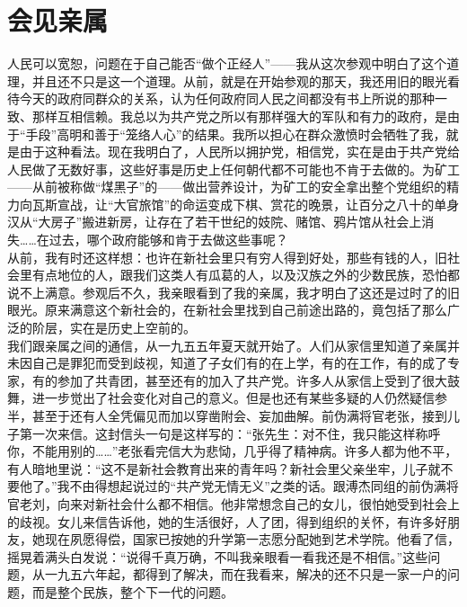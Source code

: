 \fancyhead[RO]{} %
\fancyhead[LE]{} %
\chapter*{会见亲属}
\thispagestyle{empty}
人民可以宽恕，问题在于自己能否“做个正经人”——我从这次参观中明白了这个道理，并且还不只是这一个道理。从前，就是在开始参观的那天，我还用旧的眼光看待今天的政府同群众的关系，认为任何政府同人民之间都没有书上所说的那种一致、那样互相信赖。我总以为共产党之所以有那样强大的军队和有力的政府，是由于“手段”高明和善于“笼络人心”的结果。我所以担心在群众激愤时会牺牲了我，就是由于这种看法。现在我明白了，人民所以拥护党，相信党，实在是由于共产党给人民做了无数好事，这些好事是历史上任何朝代都不可能也不肯于去做的。为矿工——从前被称做“煤黑子”的——做出营养设计，为矿工的安全拿出整个党组织的精力向瓦斯宣战，让“大官旅馆”的命运变成下棋、赏花的晚景，让百分之八十的单身汉从“大房子”搬进新房，让存在了若干世纪的妓院、赌馆、鸦片馆从社会上消失……在过去，哪个政府能够和肯于去做这些事呢？　\\

从前，我有时还这样想：也许在新社会里只有穷人得到好处，那些有钱的人，旧社会里有点地位的人，跟我们这类人有瓜葛的人，以及汉族之外的少数民族，恐怕都说不上满意。参观后不久，我亲眼看到了我的亲属，我才明白了这还是过时了的旧眼光。原来满意这个新社会的，在新社会里找到自己前途出路的，竟包括了那么广泛的阶层，实在是历史上空前的。\\

我们跟亲属之间的通信，从一九五五年夏天就开始了。人们从家信里知道了亲属并未因自己是罪犯而受到歧视，知道了子女们有的在上学，有的在工作，有的成了专家，有的参加了共青团，甚至还有的加入了共产党。许多人从家信上受到了很大鼓舞，进一步觉出了社会变化对自己的意义。但是也还有某些多疑的人仍然疑信参半，甚至于还有人全凭偏见而加以穿凿附会、妄加曲解。前伪满将官老张，接到儿子第一次来信。这封信头一句是这样写的：“张先生：对不住，我只能这样称呼你，不能用别的……”老张看完信大为悲恸，几乎得了精神病。许多人都为他不平，有人暗地里说：“这不是新社会教育出来的青年吗？新社会里父亲坐牢，儿子就不要他了。”我不由得想起说过的“共产党无情无义”之类的话。跟溥杰同组的前伪满将官老刘，向来对新社会什么都不相信。他非常想念自己的女儿，很怕她受到社会上的歧视。女儿来信告诉他，她的生活很好，人了团，得到组织的关怀，有许多好朋友，她现在夙愿得偿，国家已按她的升学第一志愿分配她到艺术学院。他看了信，摇晃着满头白发说：“说得千真万确，不叫我亲眼看一看我还是不相信。”这些问题，从一九五六年起，都得到了解决，而在我看来，解决的还不只是一家一户的问题，而是整个民族，整个下一代的问题。\\

